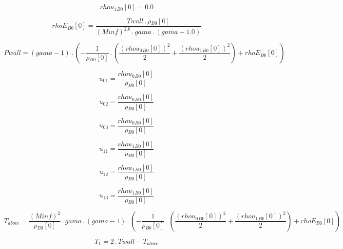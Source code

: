 \documentclass{article}
\begin{document}
\begin{dmath}{rhou_{1}{_{B0}}}[{0}] = 0.0\end{dmath}

\begin{dmath}{rhoE{_{B0}}}[{0}] = \frac{Twall \,.\, {\rho{_{B0}}}[{0}]}{\left(Minf \right)^{2.0} \,.\, gama \,.\, \left(gama - 1.0\right)}\end{dmath}

\begin{dmath}Pwall = \left(gama - 1\right) \,.\, \left(- \frac{1}{{\rho{_{B0}}}[{0}]} \,.\, \left(\frac{\left({rhou_{0}{_{B0}}}[{0}] \right)^{2}}{2} + \frac{\left({rhou_{1}{_{B0}}}[{0}] \right)^{2}}{2}\right) + {rhoE{_{B0}}}[{0}]\right)\end{dmath}

\begin{dmath}u_{01} = \frac{{rhou_{0}{_{B0}}}[{0}]}{{\rho{_{B0}}}[{0}]}\end{dmath}

\begin{dmath}u_{02} = \frac{{rhou_{0}{_{B0}}}[{0}]}{{\rho{_{B0}}}[{0}]}\end{dmath}

\begin{dmath}u_{03} = \frac{{rhou_{0}{_{B0}}}[{0}]}{{\rho{_{B0}}}[{0}]}\end{dmath}

\begin{dmath}u_{11} = \frac{{rhou_{1}{_{B0}}}[{0}]}{{\rho{_{B0}}}[{0}]}\end{dmath}

\begin{dmath}u_{12} = \frac{{rhou_{1}{_{B0}}}[{0}]}{{\rho{_{B0}}}[{0}]}\end{dmath}

\begin{dmath}u_{13} = \frac{{rhou_{1}{_{B0}}}[{0}]}{{\rho{_{B0}}}[{0}]}\end{dmath}

\begin{dmath}T_{above} = \frac{\left(Minf \right)^{2}}{{\rho{_{B0}}}[{0}]} \,.\, gama \,.\, \left(gama - 1\right) \,.\, \left(- \frac{1}{{\rho{_{B0}}}[{0}]} \,.\, \left(\frac{\left({rhou_{0}{_{B0}}}[{0}] \right)^{2}}{2} + 
\frac{\left({rhou_{1}{_{B0}}}[{0}] \right)^{2}}{2}\right) + {rhoE{_{B0}}}[{0}]\right)\end{dmath}

\begin{dmath}T_{1} = 2 \,.\, Twall - T_{above}\end{dmath}
\end{document}

